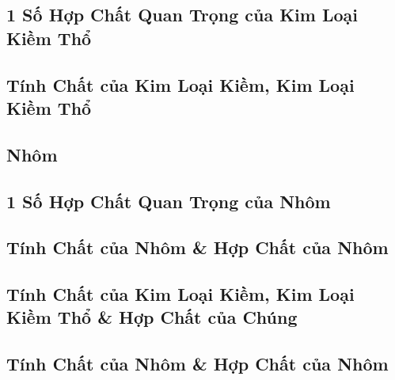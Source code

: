 \documentclass{article}
\numberwithin{equation}{section}
\begin{document}

\subsection{1 Số Hợp Chất Quan Trọng của Kim Loại Kiềm Thổ}


\subsection{Tính Chất của Kim Loại Kiềm, Kim Loại Kiềm Thổ}


\subsection{Nhôm}


\subsection{1 Số Hợp Chất Quan Trọng của Nhôm}


\subsection{Tính Chất của Nhôm \& Hợp Chất của Nhôm}


\subsection{Tính Chất của Kim Loại Kiềm, Kim Loại Kiềm Thổ \& Hợp Chất của Chúng}


\subsection{Tính Chất của Nhôm \& Hợp Chất của Nhôm}
\end{document}
